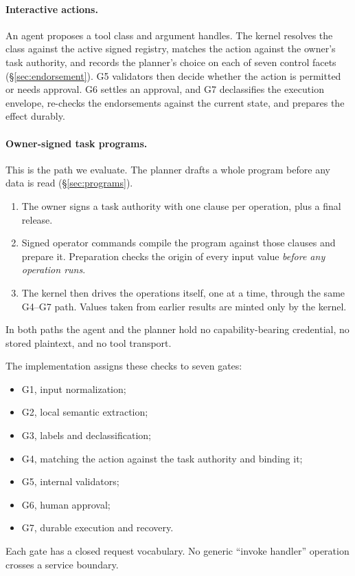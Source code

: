 \documentclass[letterpaper,twocolumn,10pt]{article}
\begin{document}
\paragraph{Interactive actions.} An agent proposes a tool class and
argument handles. The kernel resolves the class against the active signed
registry, matches the action against the owner's task authority, and
records the planner's choice on each of seven control facets
(\S\ref{sec:endorsement}). G5 validators then decide whether the action is
permitted or needs approval. G6 settles an approval, and G7 declassifies
the execution envelope, re-checks the endorsements against the current
state, and prepares the effect durably.

\paragraph{Owner-signed task programs.} This is the path we evaluate. The
planner drafts a whole program before any data is read (\S\ref{sec:programs}).
\begin{enumerate}
\item The owner signs a task authority with one clause per operation, plus
  a final release.
\item Signed operator commands compile the program against those clauses
  and prepare it. Preparation checks the origin of every input value
  \emph{before any operation runs}.
\item The kernel then drives the operations itself, one at a time, through
  the same G4--G7 path. Values taken from earlier results are minted only
  by the kernel.
\end{enumerate}
In both paths the agent and the planner hold no capability-bearing
credential, no stored plaintext, and no tool transport.

The implementation assigns these checks to seven gates:
\begin{itemize}
\item G1, input normalization;
\item G2, local semantic extraction;
\item G3, labels and declassification;
\item G4, matching the action against the task authority and binding it;
\item G5, internal validators;
\item G6, human approval;
\item G7, durable execution and recovery.
\end{itemize}
Each gate has a closed request vocabulary. No generic ``invoke handler''
operation crosses a service boundary.
\end{document}
